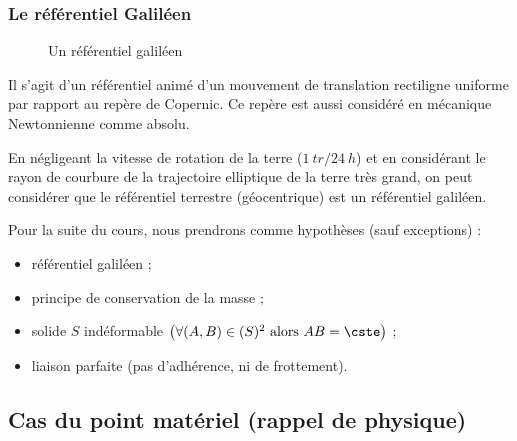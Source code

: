 \documentclass[11pt]{article}
\begin{document}
\subsubsection{Le référentiel Galiléen}

\begin{figure}
  \centering
  \vspace{-1.5em}
  \caption{Un référentiel galiléen}
  \vspace{-2em}
\end{figure}
Il s'agit d'un référentiel animé d'un mouvement de translation rectiligne uniforme par rapport au repère de Copernic. Ce repère est aussi considéré en mécanique Newtonnienne comme absolu.

En négligeant la vitesse de rotation de la terre ($\SI{1}{tr} /\SI{24}{h}$) et en considérant le rayon de courbure de la trajectoire elliptique de la terre très grand, on peut considérer que le référentiel terrestre (géocentrique) est un référentiel galiléen.

\vspace{1em}
Pour la suite du cours, nous prendrons comme hypothèses (sauf exceptions) :
\begin{itemize}
\item référentiel galiléen ;
\item principe de conservation de la masse ;
\item solide $S$ indéformable $\left(\forall (A, B)\in (S)^2 \text{ alors } AB = \cste\right)$ ;
\item liaison parfaite (pas d'adhérence, ni de frottement).
\end{itemize}

\newpage
\subsection{Cas du point matériel (rappel de physique)}
\end{document}
